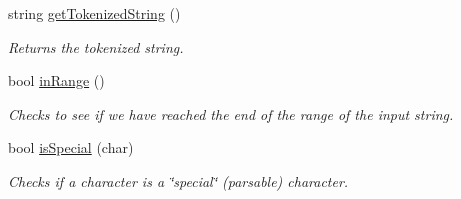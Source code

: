 \begin{DoxyCompactItemize}
string \hyperlink{classScanner_ad538231c15e7577c026a10be9b17f373}{getTokenizedString} ()
\begin{DoxyCompactList}\small\item\em Returns the tokenized string. \end{DoxyCompactList}\item 
bool \hyperlink{classScanner_a8c4ee8c91d2e7d9ab06c8dc6e86c4ca4}{inRange} ()
\begin{DoxyCompactList}\small\item\em Checks to see if we have reached the end of the range of the input string. \end{DoxyCompactList}\item 
bool \hyperlink{classScanner_afd047e2ead94064418395668a2c85253}{isSpecial} (char)
\begin{DoxyCompactList}\small\item\em Checks if a character is a \char`\"{}special\char`\"{} (parsable) character. \end{DoxyCompactList}\end{DoxyCompactItemize}
